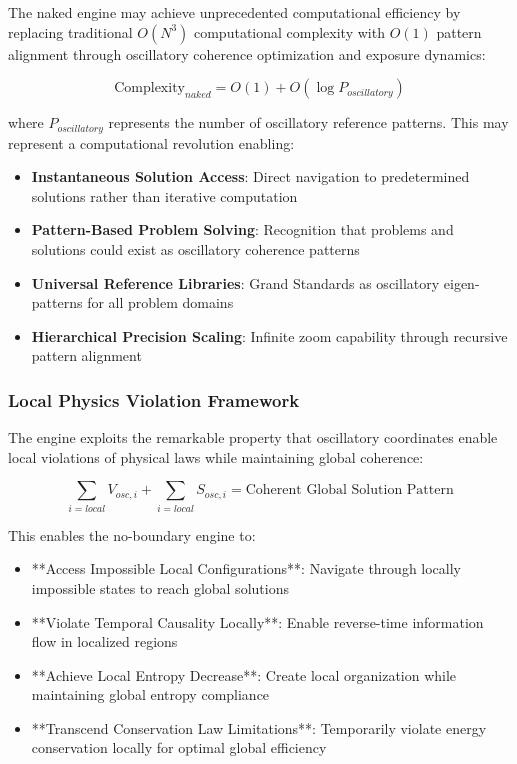 \documentclass[11pt,a4paper]{article}
\theoremstyle{remark}
\begin{document}
The naked engine may achieve unprecedented computational efficiency by replacing traditional $O(N^3)$ computational complexity with $O(1)$ pattern alignment through oscillatory coherence optimization and exposure dynamics:

\begin{equation}
\text{Complexity}_{naked} = O(1) + O(\log P_{oscillatory})
\end{equation}

where $P_{oscillatory}$ represents the number of oscillatory reference patterns. This may represent a computational revolution enabling:

\begin{itemize}
\item \textbf{Instantaneous Solution Access}: Direct navigation to predetermined solutions rather than iterative computation
\item \textbf{Pattern-Based Problem Solving}: Recognition that problems and solutions could exist as oscillatory coherence patterns
\item \textbf{Universal Reference Libraries}: Grand Standards as oscillatory eigen-patterns for all problem domains
\item \textbf{Hierarchical Precision Scaling}: Infinite zoom capability through recursive pattern alignment
\end{itemize}

\subsubsection{Local Physics Violation Framework}

The engine exploits the remarkable property that oscillatory coordinates enable local violations of physical laws while maintaining global coherence:

\begin{equation}
\sum_{i=local} V_{osc,i} + \sum_{i=local} S_{osc,i} = \text{Coherent Global Solution Pattern}
\end{equation}

This enables the no-boundary engine to:

\begin{itemize}
\item **Access Impossible Local Configurations**: Navigate through locally impossible states to reach global solutions
\item **Violate Temporal Causality Locally**: Enable reverse-time information flow in localized regions
\item **Achieve Local Entropy Decrease**: Create local organization while maintaining global entropy compliance
\item **Transcend Conservation Law Limitations**: Temporarily violate energy conservation locally for optimal global efficiency
\end{itemize}
\end{document}
